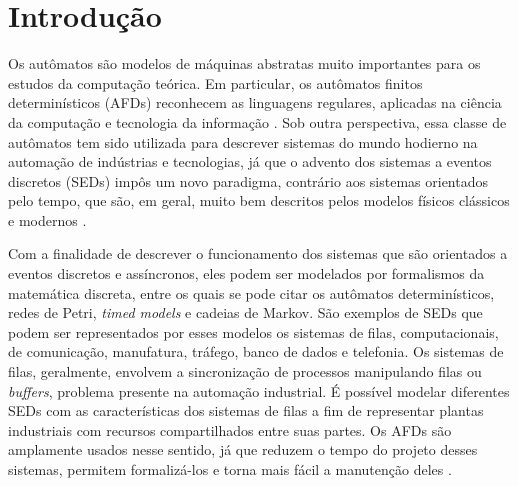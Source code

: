 \chapter{Introdução}

Os autômatos são modelos de máquinas abstratas muito importantes para os estudos da computação teórica. Em particular, os autômatos finitos determinísticos (\acs{AFD}s) reconhecem as linguagens regulares, aplicadas na ciência da computação e tecnologia da informação \cite{hopcroft}. Sob outra perspectiva, essa classe de autômatos tem sido utilizada para descrever sistemas do mundo hodierno na automação de indústrias e tecnologias, já que o advento dos sistemas a eventos discretos (\acs{SED}s) impôs um novo paradigma, contrário aos sistemas orientados pelo tempo, que são, em geral, muito bem descritos pelos modelos físicos clássicos e modernos \cite{cassandras}.

Com a finalidade de descrever o funcionamento dos sistemas que são orientados a eventos discretos e assíncronos, eles podem ser modelados por formalismos da matemática discreta, entre os quais se pode citar os autômatos determinísticos, redes de Petri, \textit{timed models} e cadeias de Markov. São exemplos de SEDs que podem ser representados por esses modelos os sistemas de filas, computacionais, de comunicação, manufatura, tráfego, banco de dados e telefonia. Os sistemas de filas, geralmente, envolvem a sincronização de processos manipulando filas ou \textit{buffers}, problema presente na automação industrial. É possível modelar diferentes SEDs com as características dos sistemas de filas a fim de representar plantas industriais com recursos compartilhados entre suas partes. Os AFDs são amplamente usados nesse sentido, já que reduzem o tempo do projeto desses sistemas, permitem formalizá-los e torna mais fácil a manutenção deles \cite{rosso1}.

